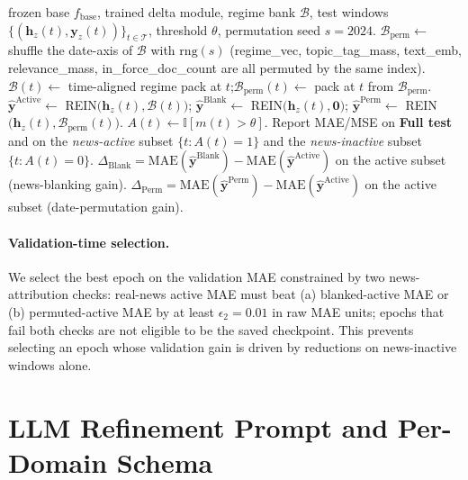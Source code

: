\documentclass{article}
\newcommand{\method}{REIN\xspace}
\begin{document}
\begin{algorithm}[H]
\caption{Counterfactual evaluation of \method on the test set.}
\label{alg:counterfactual}
\begin{algorithmic}[1]
\Require frozen base $f_{\text{base}}$, trained delta module, regime bank $\mathcal{B}$, test windows $\{(\bm{h}_z(t),\bm{y}_z(t))\}_{t\in\mathcal{T}}$, threshold $\theta$, permutation seed $s{=}2024$.
\State $\mathcal{B}_{\text{perm}}\gets$ shuffle the date-axis of $\mathcal{B}$ with $\mathrm{rng}(s)$ (regime\_vec, topic\_tag\_mass, text\_emb, relevance\_mass, in\_force\_doc\_count are all permuted by the same index).
  \State $\mathcal{B}(t)\!\gets$ time-aligned regime pack at $t$;\quad $\mathcal{B}_{\text{perm}}(t)\!\gets$ pack at $t$ from $\mathcal{B}_{\text{perm}}$.
  \State $\hat{\bm y}^{\text{Active}}\!\gets$ \method$\bigl(\bm h_z(t),\mathcal{B}(t)\bigr)$;\quad
         $\hat{\bm y}^{\text{Blank}}\!\gets$ \method$\bigl(\bm h_z(t),\mathbf{0}\bigr)$;\quad
         $\hat{\bm y}^{\text{Perm}}\!\gets$ \method$\bigl(\bm h_z(t),\mathcal{B}_{\text{perm}}(t)\bigr)$.
  \State $A(t)\!\gets\!\mathbb{I}[m(t)\!>\!\theta]$.
\EndFor
\State Report MAE/MSE on \textbf{Full test} and on the \emph{news-active} subset $\{t:A(t){=}1\}$ and the \emph{news-inactive} subset $\{t:A(t){=}0\}$.
\State $\Delta_{\text{Blank}}{=}\mathrm{MAE}(\hat{\bm y}^{\text{Blank}})-\mathrm{MAE}(\hat{\bm y}^{\text{Active}})$ on the active subset (news-blanking gain).
\State $\Delta_{\text{Perm}}{=}\mathrm{MAE}(\hat{\bm y}^{\text{Perm}})-\mathrm{MAE}(\hat{\bm y}^{\text{Active}})$ on the active subset (date-permutation gain).
\end{algorithmic}
\end{algorithm}

\paragraph{Validation-time selection.}
We select the best epoch on the validation MAE constrained by two news-attribution checks: real-news active MAE must beat (a) blanked-active MAE or (b) permuted-active MAE by at least $\epsilon_2{=}0.01$ in raw MAE units; epochs that fail both checks are not eligible to be the saved checkpoint. This prevents selecting an epoch whose validation gain is driven by reductions on news-inactive windows alone.

\section{LLM Refinement Prompt and Per-Domain Schema}
\label{app:llm}
\end{document}
